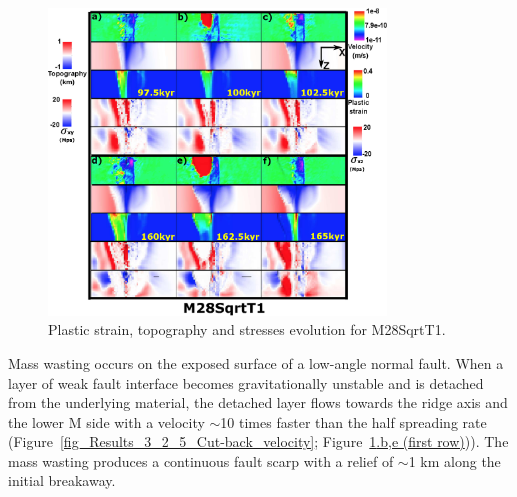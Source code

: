 \begin{figure}[h]
  \centering
    \includegraphics[width=0.8\textwidth]{./Figures/fig_Results4_4_sqrt_cut_back_with_time_1.eps}
  \caption{Plastic strain, topography and stresses evolution for M28SqrtT1.}
 \label{fig_Results4_4}
\end{figure}   

Mass wasting occurs on the exposed surface of a low-angle normal fault. %
%
%
When a layer of weak fault interface becomes gravitationally unstable and is detached from the underlying material, the detached layer flows towards the ridge axis and the lower M side with a velocity $\sim$10 times faster than the half spreading rate (Figure~\hyperref[fig_Results_3_2_5_Cut-back_velocity]{\ref{fig_Results_3_2_5_Cut-back_velocity}}; Figure~\hyperref[fig_Results4_4]{\ref{fig_Results4_4}.b,e (first row)})). 
The mass wasting produces a continuous fault scarp with a relief of $\sim$1 km along the initial breakaway. 

